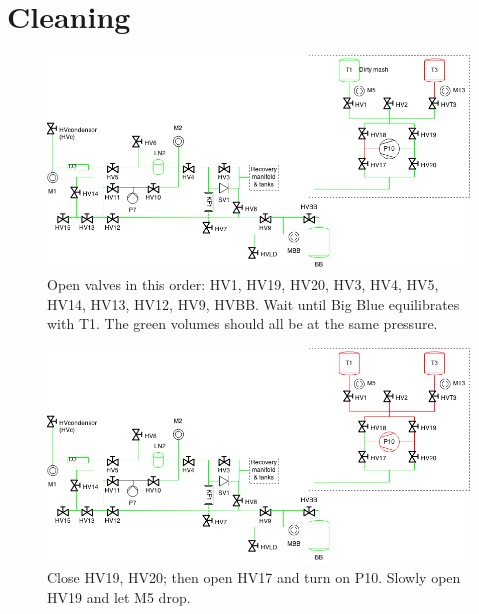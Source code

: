 \documentclass[a4paper,10pt]{article}
\begin{document}
\section{Cleaning}

\begin{figure}[htbp!]
 \centering
 \includegraphics[width=\textwidth]{./mash-cleaning-02.png}
 \caption{Open valves in this order: HV1, HV19, HV20, HV3, HV4, HV5, HV14, HV13, HV12, HV9, HVBB.  Wait until Big Blue equilibrates with T1.  The green volumes should all be at the same pressure.}
 \label{b}
\end{figure}

\begin{figure}[htbp!]
 \centering
 \includegraphics[width=\textwidth]{./mash-cleaning-03.png}
 \caption{Close HV19, HV20; then open HV17 and turn on P10.  Slowly open HV19 and let M5 drop.}
 \label{c}
\end{figure}
\end{document}
